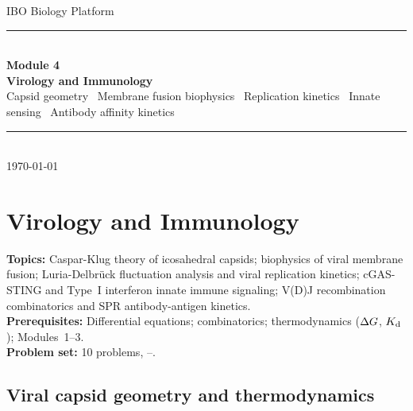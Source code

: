 \documentclass[12pt, a4paper, oneside]{report}
\begin{document}
\begin{titlepage}
  \centering
  \vspace*{4cm}
  {\sffamily\fontsize{13}{16}\selectfont\color{accent} IBO Biology Platform}\\[0.6em]
  {\rule{0.4\textwidth}{0.4pt}}\\[0.6em]
  {\sffamily\fontsize{22}{28}\selectfont\bfseries Module 4}\\[0.4em]
  {\sffamily\fontsize{16}{20}\selectfont\bfseries\color{accent}
    Virology and Immunology}\\[1.2em]
  {\small\color{gray}
    Capsid geometry \textbullet\ Membrane fusion biophysics \textbullet\
    Replication kinetics \textbullet\ Innate sensing \textbullet\
    Antibody affinity kinetics}\\[0.6em]
  {\rule{0.4\textwidth}{0.4pt}}\\[0.5em]
  {\small\color{gray} \today}
\end{titlepage}

\tableofcontents
\newpage


\chapter{Virology and Immunology}
\label{ch:virology}

\begin{tcolorbox}[colback=probback, colframe=accent, boxrule=0.5pt, arc=1pt,
  fonttitle=\bfseries\sffamily\small, coltitle=white, colbacktitle=accent,
  title={Module Overview}, top=4pt, bottom=4pt, left=6pt, right=6pt]
  \textbf{Topics:} Caspar-Klug theory of icosahedral capsids;
  biophysics of viral membrane fusion;
  Luria-Delbrück fluctuation analysis and viral replication kinetics;
  cGAS-STING and Type~I interferon innate immune signaling;
  V(D)J recombination combinatorics and SPR antibody-antigen kinetics.\\[3pt]
  \textbf{Prerequisites:} Differential equations; combinatorics;
  thermodynamics ($\Delta G$, $K_{\mathrm{d}}$); Modules~1--3.\\[3pt]
  \textbf{Problem set:} 10 problems, \stars{2}--\stars{5}.
\end{tcolorbox}

\section{Viral capsid geometry and thermodynamics}
\end{document}
